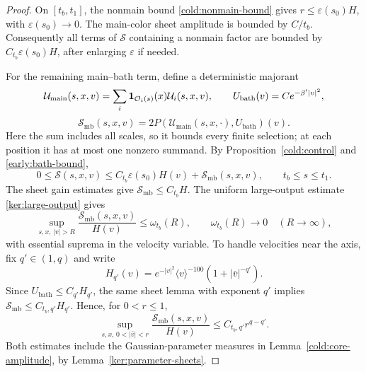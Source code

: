 \begin{proof}
On $[t_b,t_1]$, the nonmain bound \eqref{cold:nonmain-bound} gives
$r\le\varepsilon(s_0)H$, with $\varepsilon(s_0)\to0$.
The main-color sheet amplitude is bounded by $C/t_b$.
Consequently all terms of $\mathcal S$ containing a nonmain factor
are bounded by $C_{t_b}\varepsilon(s_0)H$, after enlarging
$\varepsilon$ if needed.

For the remaining main--bath term, define a deterministic majorant
\[
 \mathcal U_{\mathrm{main}}(s,x,v)
   =\sum_i\mathbf 1_{\mathcal O_i(s)}(x)\mathcal U_i(s,x,v),
 \qquad U_{\mathrm{bath}}(v)=C e^{-\beta'|v|^2},
\]
\[
 \mathcal S_{\mathrm{mb}}(s,x,v)
   =2P(\mathcal U_{\mathrm{main}}(s,x,\cdot),U_{\mathrm{bath}})(v).
\]
Here the sum includes all scales, so it bounds every finite selection;
at each position it has at most one nonzero summand.
By Proposition~\ref{cold:control} and \eqref{early:bath-bound},
\begin{equation}\label{early:common-majorant}
 0\le\mathcal S(s,x,v)
 \le C_{t_b}\varepsilon(s_0)H(v)+\mathcal S_{\mathrm{mb}}(s,x,v),
 \qquad t_b\le s\le t_1.
\end{equation}
The sheet gain estimates give $\mathcal S_{\mathrm{mb}}\le C_{t_b}H$.
The uniform large-output estimate \eqref{ker:large-output} gives
\begin{equation}\label{early:output-tail}
 \sup_{s,x,\,|v|>R}\frac{\mathcal S_{\mathrm{mb}}(s,x,v)}{H(v)}
 \le\omega_{t_b}(R),\qquad \omega_{t_b}(R)\longrightarrow0
 \quad(R\to\infty),
\end{equation}
with essential suprema in the velocity variable.
To handle velocities near the axis, fix $q'\in(1,q)$ and write
\[
 H_{q'}(v)=e^{-|v|^2}\langle v\rangle^{-100}
                 (1+|\bar v|^{-q'}).
\]
Since $U_{\mathrm{bath}}\le C_{q'}H_{q'}$, the same sheet lemma with exponent $q'$
implies $\mathcal S_{\mathrm{mb}}\le C_{t_b,q'}H_{q'}$. Hence, for $0<r\le1$,
\begin{equation}\label{early:output-axis}
 \sup_{s,x,\,0<|\bar v|<r}\frac{\mathcal S_{\mathrm{mb}}(s,x,v)}{H(v)}
 \le C_{t_b,q'}r^{q-q'}.
\end{equation}
Both estimates include the Gaussian-parameter measures in
Lemma~\ref{cold:core-amplitude}, by Lemma~\ref{ker:parameter-sheets}.


\end{proof}
